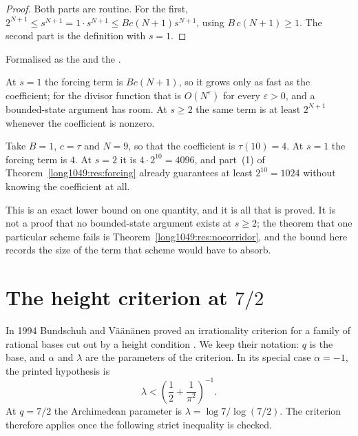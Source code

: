 \begin{proof}
Both parts are routine.  For the first,
$2^{N+1}\le s^{N+1}=1\cdot s^{N+1}\le Bc(N+1)s^{N+1}$,
using $B\,c(N+1)\ge1$.  The second part is the definition with $s=1$.
\end{proof}

\noindent Formalised as the
 and the
.

At $s=1$ the forcing term is $Bc(N+1)$, so it grows only as fast as the
coefficient; for the divisor function that is $O(N^{\varepsilon})$ for every
$\varepsilon>0$, and a bounded-state argument has room.  At $s\ge2$ the same
term is at least $2^{N+1}$ whenever the coefficient is nonzero.

\begin{example}\label{long1049:ex:forcing}
Take $B=1$, $c=\tau$ and $N=9$, so that the coefficient is $\tau(10)=4$.  At
$s=1$ the forcing term is $4$.  At $s=2$ it is $4\cdot2^{10}=4096$, and part~(1)
of Theorem~\ref{long1049:res:forcing} already guarantees at least $2^{10}=1024$ without
knowing the coefficient at all.
\end{example}

This is an
exact lower bound on one quantity, and it is all that is proved.  It is not a
proof that no bounded-state argument exists at $s\ge2$; the theorem that one
particular scheme fails is Theorem~\ref{long1049:res:nocorridor}, and the bound here
records the size of the term that scheme would have to absorb.

\section{The height criterion at $7/2$}\label{long1049:sec:sevenhalves}

In 1994 Bundschuh and V\"a\"an\"anen proved an irrationality criterion for a
family of rational bases cut out by a height condition
\cite[Theorem~2, p.~177; hypotheses pp.~175--176]{bv1994}.  We keep their
notation: $q$ is the base, and $\alpha$
and $\lambda$ are the parameters of the criterion.  In its special case
$\alpha=-1$, the printed hypothesis is
\[
 \lambda<\left(\frac12+\frac1{\pi^2}\right)^{-1}.
\]
At $q=7/2$ the Archimedean parameter is
$\lambda=\log 7/\log(7/2)$.  The criterion therefore applies once the following
strict inequality is checked.

